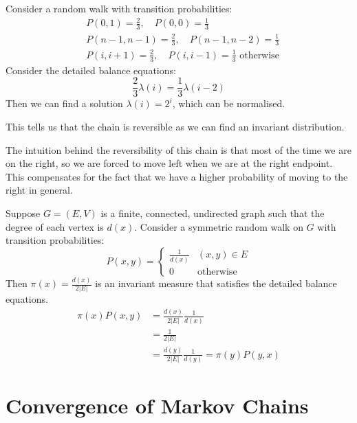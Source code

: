 \documentclass[../Main.tex]{subfiles}
\begin{document}
\begin{example}
    Consider a random walk with transition probabilities:
    \begin{align*}
        &P(0, 1) = \frac23,\quad P(0, 0) = \frac13 \\
        &P(n-1, n-1) = \frac23,\quad P(n-1, n-2) = \frac13 \\
        &P(i, i+1) = \frac23,\quad P(i, i-1) = \frac13 \text{ otherwise}
    \end{align*}
    Consider the detailed balance equations:
    \begin{equation*}
        \frac23\lambda(i) = \frac13 \lambda(i-2)
    \end{equation*}
    Then we can find a solution $\lambda(i) = 2^i$, which can be normalised.

    This tells us that the chain is reversible as we can find an invariant distribution.

    The intuition behind the reversibility of this chain is that most of the time we are on the right, so we are forced to move left when we are at the right endpoint. This compensates for the fact that we have a higher probability of moving to the right in general.
\end{example}
\begin{example}
    Suppose $G = (E, V)$ is a finite, connected, undirected graph such that the degree of each vertex is $d(x)$. Consider a symmetric random walk on $G$ with transition probabilities:
    \begin{equation*}
        P(x, y) =
        \begin{cases}
            \frac1{d(x)} & (x, y) \in E \\
            0 & \text{otherwise}
        \end{cases}
    \end{equation*}
    Then $\pi(x) = \frac{d(x)}{2|E|}$ is an invariant measure that satisfies the detailed balance equations.
    \begin{align*}
        \pi(x) P(x, y) &= \frac{d(x)}{2|E|} \frac{1}{d(x)} \\
        &= \frac{1}{2|E|} \\
        &= \frac{d(y)}{2|E|} \frac{1}{d(y)} = \pi(y) P(y, x)
    \end{align*}
\end{example}
\section{Convergence of Markov Chains}
\end{document}
